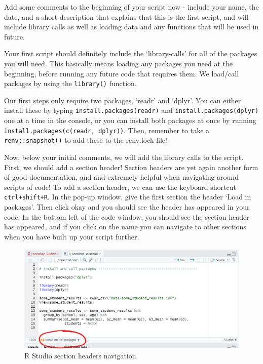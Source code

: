 \documentclass[
  12pt,
]{article}
\begin{document}
Add some comments to the beginning of your script now - include your
name, the date, and a short description that explains that this is the
first script, and will include library calls as well as loading data and
any functions that will be used in future.

Your first script should definitely include the `library-calls' for all
of the packages you will need. This basically means loading any packages
you need at the beginning, before running any future code that requires
them. We load/call packages by using the \texttt{library()} function.

Our first steps only require two packages, `readr' and `dplyr'. You can
either install these by typing
\texttt{install.packages(\textquotesingle{}readr\textquotesingle{})} and
\texttt{install.packages(\textquotesingle{}dplyr\textquotesingle{})} one
at a time in the console, or you can install both packages at once by
running
\texttt{install.packages(c(\textquotesingle{}readr\textquotesingle{},\ \textquotesingle{}dplyr\textquotesingle{}))}.
Then, remember to take a \texttt{renv::snapshot()} to add these to the
renv.lock file!

Now, below your initial comments, we will add the library calls to the
script. First, we should add a section header! Section headers are yet
again another form of good documentation, and and extremely helpful when
navigating around scripts of code! To add a section header, we can use
the keyboard shortcut \texttt{ctrl+shift+R}. In the pop-up window, give
the first section the header `Load in packages'. Then click okay and you
should see the header has appeared in your code. In the bottom left of
the code window, you should see the section header has appeared, and if
you click on the name you can navigate to other sections when you have
built up your script further.

\begin{figure}
\includegraphics[width=1\linewidth]{images/RforRAP/section_headers} \caption{R Studio section headers navigation}\label{fig:unnamed-chunk-4}
\end{figure}
\end{document}
